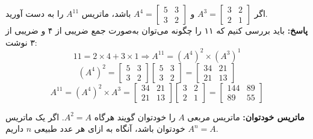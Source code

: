 \begin{example}
	اگر
	$A^3=
	\begin{bmatrix}
		3 & 2 \\
		2 & 1
	\end{bmatrix}$ و
	$A^4=
	\begin{bmatrix}
		5 & 3 \\
		3 & 2
	\end{bmatrix}$
	باشد، ماتریس
	$A^{11}$
	را به دست آورید. \\
	\textbf{پاسخ:}
	باید بررسی کنیم که ۱۱ را چگونه می‌توان به‌صورت جمع ضریبی از ۴ و ضریبی از ۳ نوشت:
	$$11=2 \times 4 + 3 \times 1 \Rightarrow A^{11} = (A^4)^2 \times (A^3)^1$$
	\[
	(A^4)^2=
	\begin{bmatrix}
		5 & 3 \\
		3 & 2
	\end{bmatrix}
	\begin{bmatrix}
		5 & 3 \\
		3 & 2
	\end{bmatrix}
	=
	\begin{bmatrix}
		34 & 21 \\
		21 & 13
	\end{bmatrix}
	\]
	\[
	A^{11}=(A^4)^2 \times A^3=
	\begin{bmatrix}
		34 & 21 \\
		21 & 13
	\end{bmatrix}
	\begin{bmatrix}
		3 & 2 \\
		2 & 1
	\end{bmatrix}
	=
	\begin{bmatrix}
		144 & 89 \\
		89 & 55
	\end{bmatrix}
	\]
\end{example}
\smallskip
\textbf{ماتریس خودتوان:}
ماتریس مربعی $A$ را خودتوان گویند هرگاه
$A^2=A$.
اگر یک ماتریس خودتوان باشد، آنگاه به ازای هر عدد طبیعی $n$ داریم
$A^n=A$.

